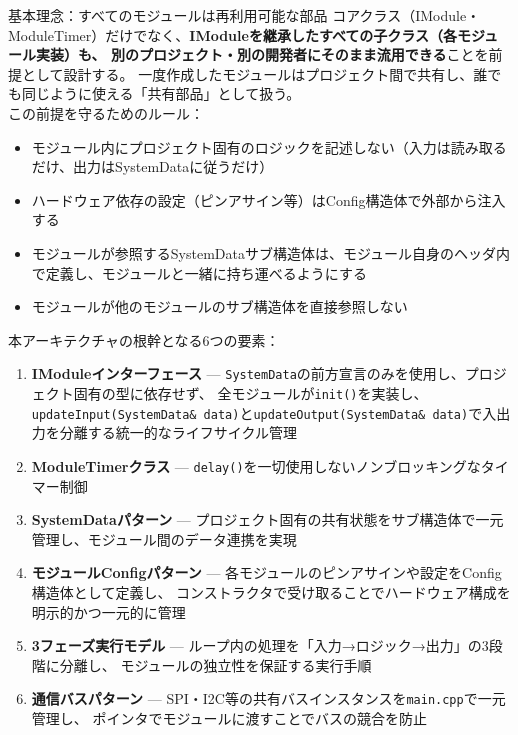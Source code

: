 \begin{funcblock}{基本理念：すべてのモジュールは再利用可能な部品}
コアクラス（IModule・ModuleTimer）だけでなく、\textbf{IModuleを継承したすべての子クラス（各モジュール実装）も、
別のプロジェクト・別の開発者にそのまま流用できる}ことを前提として設計する。
一度作成したモジュールはプロジェクト間で共有し、誰でも同じように使える「共有部品」として扱う。\\[6pt]
この前提を守るためのルール：
\begin{itemize}
    \item モジュール内にプロジェクト固有のロジックを記述しない（入力は読み取るだけ、出力はSystemDataに従うだけ）
    \item ハードウェア依存の設定（ピンアサイン等）はConfig構造体で外部から注入する
    \item モジュールが参照するSystemDataサブ構造体は、モジュール自身のヘッダ内で定義し、モジュールと一緒に持ち運べるようにする
    \item モジュールが他のモジュールのサブ構造体を直接参照しない
\end{itemize}
\end{funcblock}

本アーキテクチャの根幹となる6つの要素：

\begin{enumerate}
    \item \textbf{IModuleインターフェース} — \texttt{SystemData}の前方宣言のみを使用し、プロジェクト固有の型に依存せず、
    全モジュールが\texttt{init()}を実装し、\texttt{updateInput(SystemData\& data)}と\texttt{updateOutput(SystemData\& data)}で入出力を分離する統一的なライフサイクル管理
    \item \textbf{ModuleTimerクラス} — \texttt{delay()}を一切使用しないノンブロッキングなタイマー制御
    \item \textbf{SystemDataパターン} — プロジェクト固有の共有状態をサブ構造体で一元管理し、モジュール間のデータ連携を実現
    \item \textbf{モジュールConfigパターン} — 各モジュールのピンアサインや設定をConfig構造体として定義し、
    コンストラクタで受け取ることでハードウェア構成を明示的かつ一元的に管理
    \item \textbf{3フェーズ実行モデル} — ループ内の処理を「入力→ロジック→出力」の3段階に分離し、
    モジュールの独立性を保証する実行手順
    \item \textbf{通信バスパターン} — SPI・I2C等の共有バスインスタンスを\texttt{main.cpp}で一元管理し、
    ポインタでモジュールに渡すことでバスの競合を防止
\end{enumerate}

